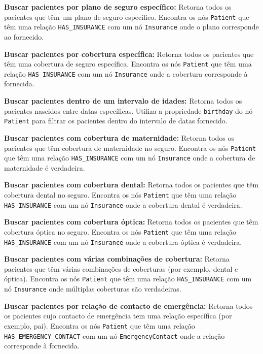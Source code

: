 \vspace{0.15cm} 
\textbf{Buscar pacientes por plano de seguro específico:} Retorna todos os pacientes que têm um plano de seguro específico. Encontra os nós \texttt{Patient} que têm uma relação \texttt{HAS\_INSURANCE} com um nó \texttt{Insurance} onde o plano corresponde ao fornecido.

\vspace{0.15cm} 
\textbf{Buscar pacientes por cobertura específica:} Retorna todos os pacientes que têm uma cobertura de seguro específica. Encontra os nós \texttt{Patient} que têm uma relação \texttt{HAS\_INSURANCE} com um nó \texttt{Insurance} onde a cobertura corresponde à fornecida.

\vspace{0.15cm} 
\textbf{Buscar pacientes dentro de um intervalo de idades:} Retorna todos os pacientes nascidos entre datas específicas. Utiliza a propriedade \texttt{birthday} do nó \texttt{Patient} para filtrar os pacientes dentro do intervalo de datas fornecido.

\vspace{0.15cm}
\textbf{Buscar pacientes com cobertura de maternidade:} Retorna todos os pacientes que têm cobertura de maternidade no seguro. Encontra os nós \texttt{Patient} que têm uma relação \texttt{HAS\_INSURANCE} com um nó \texttt{Insurance} onde a cobertura de maternidade é verdadeira.

\vspace{0.15cm} 
\textbf{Buscar pacientes com cobertura dental:} Retorna todos os pacientes que têm cobertura dental no seguro. Encontra os nós \texttt{Patient} que têm uma relação \texttt{HAS\_INSURANCE} com um nó \texttt{Insurance} onde a cobertura dental é verdadeira.

\vspace{0.15cm} 
\textbf{Buscar pacientes com cobertura óptica:} Retorna todos os pacientes que têm cobertura óptica no seguro. Encontra os nós \texttt{Patient} que têm uma relação \texttt{HAS\_INSURANCE} com um nó \texttt{Insurance} onde a cobertura óptica é verdadeira.

\vspace{0.15cm} 
\textbf{Buscar pacientes com várias combinações de cobertura:} Retorna pacientes que têm várias combinações de coberturas (por exemplo, dental e óptica). Encontra os nós \texttt{Patient} que têm uma relação \texttt{HAS\_INSURANCE} com um nó \texttt{Insurance} onde múltiplas coberturas são verdadeiras.

\vspace{0.15cm} 
\textbf{Buscar pacientes por relação de contacto de emergência:} Retorna todos os pacientes cujo contacto de emergência tem uma relação específica (por exemplo, pai). Encontra os nós \texttt{Patient} que têm uma relação \texttt{HAS\_EMERGENCY\_CONTACT} com um nó \texttt{EmergencyContact} onde a relação corresponde à fornecida.

